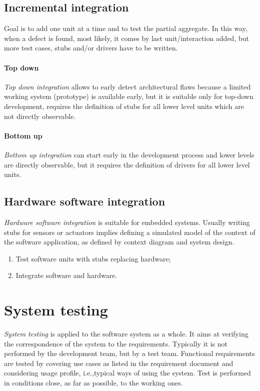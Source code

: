 \subsection*{Incremental integration}
Goal is to add one unit at a time and to test the partial aggregate. In this way, when a defect is found, most likely, it comes by last unit/interaction added, but more test cases, stubs and/or drivers have to be written.

\paragraph{Top down}
\emph{Top down integration} allows to early detect architectural flaws because a limited working system (prototype) is available early, but it is suitable only for top-down development, requires the definition of stubs for all lower level units which are not directly observable.

\paragraph{Bottom up}
\emph{Bottom up integration} can start early in the development process and lower levels are directly observable, but it requires the definition of drivers for all lower level units.

\subsection*{Hardware software integration}
\emph{Hardware software integration} is suitable for embedded systems. Usually writing stubs for sensors or actuators implies defining a simulated model of the context of the software application, as defined by context diagram and system design.

\begin{enumerate}
\item Test software units with stubs replacing hardware;
\item Integrate software and hardware.
\end{enumerate}

\section{System testing}
\emph{System testing} is applied to the software system as a whole. It aims at verifying the correspondence of the system to the requirements. Typically it is not performed by the development team, but by a test team. Functional requirements are tested by covering use cases as listed in the requirement document and considering usage profile, i.e.,\@ typical ways of using the system. Test is performed in conditions close, as far as possible, to the working ones.

